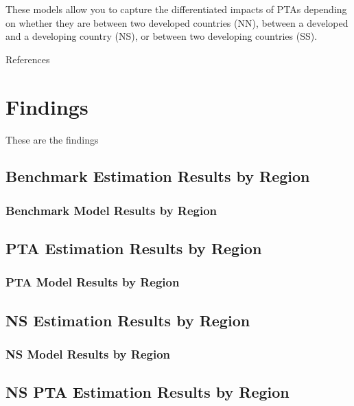 \documentclass{article}%
\begin{document}
These models allow you to capture the differentiated impacts of PTAs
depending on whether they are between two developed countries (NN),
between a developed and a developing country (NS), or between two
developing countries (SS).

References

%
\section{Findings}%
\label{sec:Findings}%
These are the findings

%
\subsection{Benchmark Estimation Results by Region}%
\label{subsec:BenchmarkEstimationResultsbyRegion}%
\subsubsection{Benchmark Model Results by Region}%
\label{ssubsec:BenchmarkModelResultsbyRegion}%


%
\subsection{PTA Estimation Results by Region}%
\label{subsec:PTAEstimationResultsbyRegion}%
\subsubsection{PTA Model Results by Region}%
\label{ssubsec:PTAModelResultsbyRegion}%
%
%
%
%


%
\subsection{NS Estimation Results by Region}%
\label{subsec:NSEstimationResultsbyRegion}%
\subsubsection{NS Model Results by Region}%
\label{ssubsec:NSModelResultsbyRegion}%


%
\subsection{NS PTA Estimation Results by Region}%
\label{subsec:NSPTAEstimationResultsbyRegion}%
\end{document}

